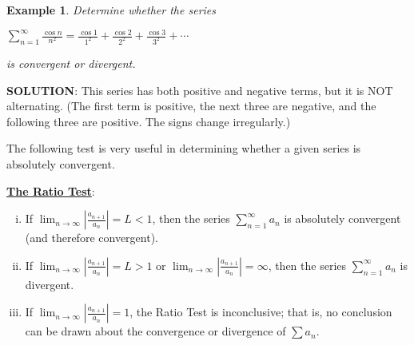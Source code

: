 \documentclass[paper=a4, fontsize=11pt]{scrartcl} %
\numberwithin{equation}{section} %
\numberwithin{figure}{section} %
\numberwithin{table}{section} %
\newtheorem{example}{Example}
\newcommand{\ds}{\displaystyle}
\newcommand{\enter}{\vspace{5mm}}
\newcommand{\senter}{\vspace{3mm}}
\begin{document}
\begin{example}
Determine whether the series

\senter

\begin{center}
$\ds\sum_{n=1}^{\infty}\frac{\cos n}{n^2}=\frac{\cos1}{1^2}+\frac{\cos2}{2^2}+\frac{\cos3}{3^2}+\cdots$
\end{center}

\senter

\noindent is convergent or divergent.
\end{example}

\senter

\noindent\textbf{SOLUTION}: This series has both positive and negative terms, but it is NOT alternating. (The first term is positive, the next three are negative, and the following three are positive. The signs change irregularly.)

\newpage


\enter

\noindent The following test is very useful in determining whether a given series is absolutely convergent.

\begin{framed}
\noindent\underline{\textbf{The Ratio Test}}:

\senter

\begin{enumerate}[(i)]

\item If $\ds\lim_{n\to\infty}\left|\frac{a_{n+1}}{a_n}\right|=L<1$, then the series $\ds\sum_{n=1}^{\infty}a_n$ is absolutely convergent (and therefore convergent).

\enter

\item If $\ds\lim_{n\to\infty}\left|\frac{a_{n+1}}{a_n}\right|=L>1$ or  $\ds\lim_{n\to\infty}\left|\frac{a_{n+1}}{a_n}\right|=\infty$, then the series $\ds\sum_{n=1}^{\infty}a_n$ is divergent.

\enter

\item If $\ds\lim_{n\to\infty}\left|\frac{a_{n+1}}{a_n}\right|=1$, the Ratio Test is inconclusive; that is, no conclusion can be drawn about the convergence or divergence of $\ds\sum a_n$.

\end{enumerate}
\end{framed}

\enter
\end{document}

